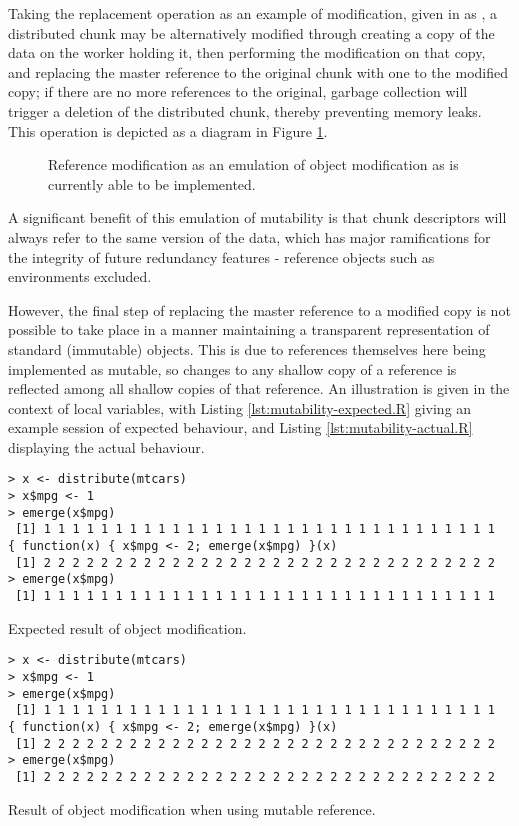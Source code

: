 Taking the replacement operation as an example of modification, given in \R{} as \code{\$<-}, a distributed chunk may be alternatively modified through creating a copy of the data on the worker holding it, then performing the modification on that copy, and replacing the master reference to the original chunk with one to the modified copy; if there are no more references to the original, garbage collection will trigger a deletion of the distributed chunk, thereby preventing memory leaks.
This operation is depicted as a diagram in Figure \ref{fig:modifyref}.

\begin{figure}

\caption{Reference modification as an emulation of object modification as is currently able to be implemented.}
\label{fig:modifyref}
\end{figure}

A significant benefit of this emulation of mutability is that chunk descriptors will always refer to the same version of the data, which has major ramifications for the integrity of future redundancy features - reference objects such as environments excluded.

However, the final step of replacing the master reference to a modified copy is not possible to take place in a manner maintaining a transparent representation of standard (immutable) \R{} objects.
This is due to references themselves here being implemented as mutable, so changes to any shallow copy of a reference is reflected among all shallow copies of that reference.
An illustration is given in the context of local variables, with Listing \ref{lst:mutability-expected.R} giving an example \R{} session of expected behaviour, and Listing \ref{lst:mutability-actual.R} displaying the actual behaviour.

\begin{listing}
\begin{verbatim}
> x <- distribute(mtcars)
> x$mpg <- 1
> emerge(x$mpg)
 [1] 1 1 1 1 1 1 1 1 1 1 1 1 1 1 1 1 1 1 1 1 1 1 1 1 1 1 1 1 1 1 1 1
{ function(x) { x$mpg <- 2; emerge(x$mpg) }(x)
 [1] 2 2 2 2 2 2 2 2 2 2 2 2 2 2 2 2 2 2 2 2 2 2 2 2 2 2 2 2 2 2 2 2
> emerge(x$mpg)
 [1] 1 1 1 1 1 1 1 1 1 1 1 1 1 1 1 1 1 1 1 1 1 1 1 1 1 1 1 1 1 1 1 1
\end{verbatim}
\caption{Expected result of object modification.}
\label{lst:mutability-expected.R}
\end{listing}

\begin{listing}
\begin{verbatim}
> x <- distribute(mtcars)
> x$mpg <- 1
> emerge(x$mpg)
 [1] 1 1 1 1 1 1 1 1 1 1 1 1 1 1 1 1 1 1 1 1 1 1 1 1 1 1 1 1 1 1 1 1
{ function(x) { x$mpg <- 2; emerge(x$mpg) }(x)
 [1] 2 2 2 2 2 2 2 2 2 2 2 2 2 2 2 2 2 2 2 2 2 2 2 2 2 2 2 2 2 2 2 2
> emerge(x$mpg)
 [1] 2 2 2 2 2 2 2 2 2 2 2 2 2 2 2 2 2 2 2 2 2 2 2 2 2 2 2 2 2 2 2 2
\end{verbatim}
\caption{Result of object modification when using mutable reference.}
\label{lst:mutability-actual.R}
\end{listing}


